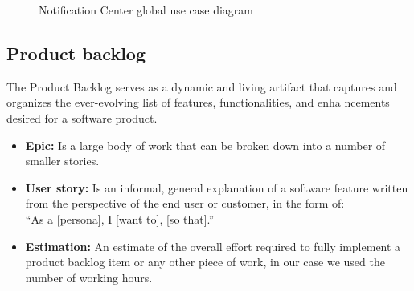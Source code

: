 \begin{figure}[hbt!]
    \centering
    
    \caption{Notification Center global use case diagram}
    \label{g-usecase}
\end{figure}

\subsection{Product backlog}
The Product Backlog serves as a dynamic and living artifact that captures and organizes the 
ever-evolving list of features, functionalities, and enha   ncements desired for a software product.

\begin{itemize}
    \item \textbf{Epic:} Is a large body of work that can be broken down into a number of smaller stories.
    \item \textbf{User story:} Is an informal, general explanation of a software feature written from the 
    perspective of the end user or customer, in the form of: \\ “As a [persona], I [want to], [so that].”
    \item \textbf{Estimation:} An estimate of the overall effort required to fully implement a product 
    backlog item or any other piece of work, in our case we used the number of working hours. \\
\end{itemize}

